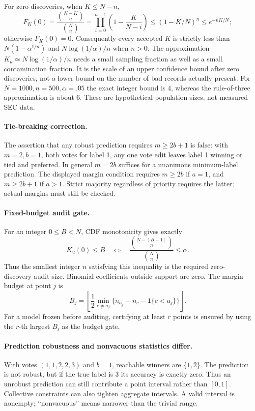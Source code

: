 \documentclass[11pt]{article}
\newcommand{\ind}{\mathbf 1}
\begin{document}
For zero discoveries, when $K\le N-n$,
\[
F_K(0)=\frac{\binom{N-K}n}{\binom Nn}
=\prod_{i=0}^{n-1}\left(1-\frac K{N-i}\right)
\le(1-K/N)^n\le e^{-nK/N};
\]
otherwise $F_K(0)=0$. Consequently every accepted $K$ is strictly less
than $N(1-\alpha^{1/n})$ and $N\log(1/\alpha)/n$ when $n>0$.
The approximation $K_u\simeq N\log(1/\alpha)/n$ needs a small sampling
fraction as well as a small contamination fraction. It is the scale of
an upper confidence bound after zero discoveries, not a lower bound on
the number of bad records actually present. For $N=1000,n=500,\alpha=.05$
the exact integer bound is $4$, whereas the rule-of-three approximation
is about $6$. These are hypothetical population sizes, not measured SEC data.

\paragraph{Tie-breaking correction.}
The assertion that any robust prediction requires $m\ge2b+1$ is false:
with $m=2,b=1$, both votes for label 1, any one vote edit leaves label 1
winning or tied and preferred. In general $m=2b$ suffices for a unanimous
minimum-label prediction. The displayed margin condition requires
$m\ge2b$ if $a=1$, and $m\ge2b+1$ if $a>1$. Strict majority regardless
of priority requires the latter; actual margins must still be checked.

\paragraph{Fixed-budget audit gate.}
For an integer $0\le B<N$, CDF monotonicity gives exactly
\[
K_u(0)\le B\quad\Longleftrightarrow\quad
\frac{\binom{N-(B+1)}n}{\binom Nn}\le\alpha.
\]
Thus the smallest integer $n$ satisfying this inequality is the required
zero-discovery audit size. Binomial coefficients outside support are zero.
The margin budget at point $j$ is
\[
B_j=\left\lfloor\frac12\min_{c\ne a_j}
\{n_{a_j}-n_c-\ind\{c<a_j\}\}\right\rfloor.
\]
For a model frozen before auditing, certifying at least $r$ points is
ensured by using the $r$-th largest $B_j$ as the budget gate.

\paragraph{Prediction robustness and nonvacuous statistics differ.}
With votes $(1,1,2,2,3)$ and $b=1$, reachable winners are $\{1,2\}$.
The prediction is not robust, but if the true label is 3 its accuracy is
exactly zero. Thus an unrobust prediction can still contribute a point
interval rather than $[0,1]$. Collective constraints can also tighten
aggregate intervals. A valid interval is nonempty; ``nonvacuous'' means
narrower than the trivial range.
\end{document}
